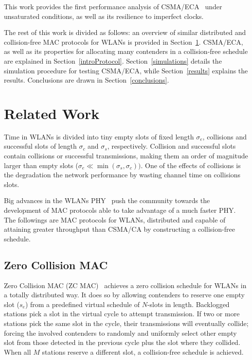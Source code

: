 \documentclass[a4paper,journal]{IEEEtran}
\begin{document}
This work provides the first performance analysis of CSMA/ECA~\cite{research2standards} under unsaturated conditions, as well as its resilience to imperfect clocks.


The rest of this work is divided as follows: an overview of similar distributed and collision-free MAC protocols for WLANs is provided in  Section~\ref{relatedWork}. CSMA/ECA, as well as its properties for allocating many contenders in a collision-free schedule are explained in Section~\ref{introProtocol}. Section~\ref{simulations} details the simulation procedure for testing CSMA/ECA, while Section~\ref{results} explains the results. Conclusions are drawn in Section~\ref{conclusions}.




\section{Related Work}\label{relatedWork}
Time in WLANs is divided into tiny empty slots of fixed length $\sigma_{e}$, collisions and successful slots of length $\sigma_{c}$ and $\sigma_{s}$, respectively. Collision and successful slots contain collisions or successful transmissions, making them an order of magnitude larger than empty slots ($\sigma_{e}\ll\min(\sigma_{s},\sigma_{c}))$. One of the effects of collisions is the degradation the network performance by wasting channel time on collisions slots. 

Big advances in the WLANs PHY~\cite{perahia2008ieee,6191306} push the community towards the development of MAC protocols able to take advantage of a much faster PHY. The followings are MAC protocols for WLANs, distributed and capable of attaining greater throughput than CSMA/CA by constructing a collision-free schedule.

\subsection{Zero Collision MAC} 

Zero Collision MAC (ZC MAC)~\cite{ZMAC} achieves a zero collision schedule for WLANs in a totally distributed way. It does so by allowing contenders to reserve one empty slot ($s_{e}$) from a  predefined virtual schedule of $N$-slots in length. Backlogged stations pick a slot in the virtual cycle to attempt transmission. If two or more stations pick the same slot in the cycle, their transmissions will eventually collide; forcing the involved contenders to randomly and uniformly select other empty slot from those detected in the previous cycle plus the slot where they collided. When all $M$ stations reserve a different slot, a collision-free schedule is achieved.
\end{document}
